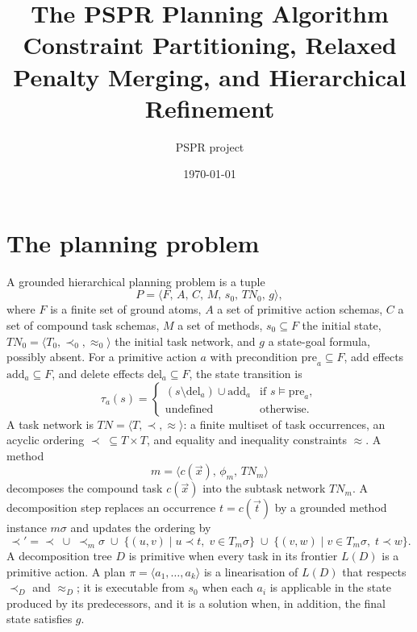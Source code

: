 \documentclass[11pt,a4paper]{article}
\title{The PSPR Planning Algorithm\\[2pt]
\large Constraint Partitioning, Relaxed Penalty Merging, and Hierarchical Refinement}
\author{PSPR project}
\date{\today}
\newcommand{\pre}{\mathrm{pre}}
\newcommand{\add}{\mathrm{add}}
\newcommand{\del}{\mathrm{del}}
\begin{document}
\maketitle

\section{The planning problem}

A grounded hierarchical planning problem is a tuple
\begin{equation}
P=\langle F,\,A,\,C,\,M,\,s_0,\,TN_0,\,g\rangle,
\end{equation}
where $F$ is a finite set of ground atoms, $A$ a set of primitive action schemas,
$C$ a set of compound task schemas, $M$ a set of methods,
$s_0\subseteq F$ the initial state, $TN_0=\langle T_0,\prec_0,\approx_0\rangle$
the initial task network, and $g$ a state-goal formula, possibly absent.
For a primitive action $a$ with precondition $\pre_a\subseteq F$,
add effects $\add_a\subseteq F$, and delete effects $\del_a\subseteq F$,
the state transition is
\begin{equation}
\tau_a(s)=
\begin{cases}
(s\setminus\del_a)\cup\add_a & \text{if } s\models\pre_a,\\
\text{undefined} & \text{otherwise}.
\end{cases}
\end{equation}
A task network is $TN=\langle T,\prec,\approx\rangle$: a finite multiset of task
occurrences, an acyclic ordering $\prec\;\subseteq T\times T$, and equality and
inequality constraints $\approx$. A method
\begin{equation}
m=\langle c(\vec{x}),\,\phi_m,\,TN_m\rangle
\end{equation}
decomposes the compound task $c(\vec{x})$ into the subtask network $TN_m$.
A decomposition step replaces an occurrence $t=c(\vec{t})$ by a grounded method
instance $m\sigma$ and updates the ordering by
\begin{equation}
\prec'=\prec\;\cup\;\prec_m\sigma
\;\cup\;\{(u,v)\mid u\prec t,\;v\in T_m\sigma\}
\;\cup\;\{(v,w)\mid v\in T_m\sigma,\;t\prec w\}.
\end{equation}
A decomposition tree $D$ is primitive when every task in its frontier $L(D)$
is a primitive action. A plan $\pi=\langle a_1,\dots,a_k\rangle$ is a
linearisation of $L(D)$ that respects $\prec_D$ and $\approx_D$; it is
executable from $s_0$ when each $a_i$ is applicable in the state produced by
its predecessors, and it is a solution when, in addition, the final state
satisfies $g$.
\end{document}
